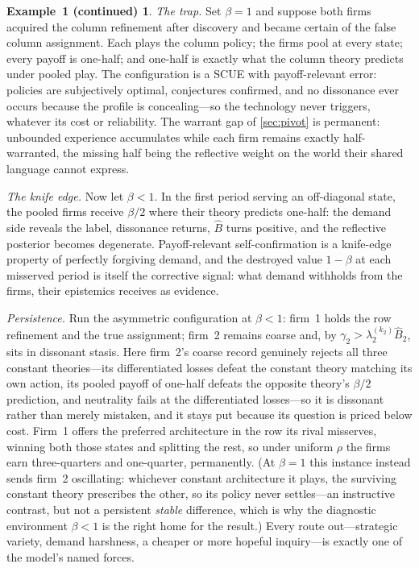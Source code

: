 \documentclass[11pt]{article}
\theoremstyle{definition}
\newtheorem*{excont}{Example~1 (continued)}
\begin{document}
\begin{excont}
\emph{The trap.}
Set $\beta=1$ and suppose both firms acquired the column refinement after discovery and became certain of the false column assignment.
Each plays the column policy; the firms pool at every state; every payoff is one-half; and one-half is exactly what the column theory predicts under pooled play.
The configuration is a SCUE with payoff-relevant error: policies are subjectively optimal, conjectures confirmed, and no dissonance ever occurs because the profile is concealing---so the technology never triggers, whatever its cost or reliability.
The warrant gap of \cref{sec:pivot} is permanent: unbounded experience accumulates while each firm remains exactly half-warranted, the missing half being the reflective weight on the world their shared language cannot express.

\emph{The knife edge.}
Now let $\beta<1$.
In the first period serving an off-diagonal state, the pooled firms receive $\beta/2$ where their theory predicts one-half: the demand side reveals the label, dissonance returns, $\widehat B$ turns positive, and the reflective posterior becomes degenerate.
Payoff-relevant self-confirmation is a knife-edge property of perfectly forgiving demand, and the destroyed value $1-\beta$ at each misserved period is itself the corrective signal: what demand withholds from the firms, their epistemics receives as evidence.

\emph{Persistence.}
Run the asymmetric configuration at $\beta<1$: firm~1 holds the row refinement and the true assignment; firm~2 remains coarse and, by $\gamma_2>\lambda_2^{(k_2)}\widehat B_2$, sits in dissonant stasis.
Here firm~2's coarse record genuinely rejects all three constant theories---its differentiated losses defeat the constant theory matching its own action, its pooled payoff of one-half defeats the opposite theory's $\beta/2$ prediction, and neutrality fails at the differentiated losses---so it is dissonant rather than merely mistaken, and it stays put because its question is priced below cost.
Firm~1 offers the preferred architecture in the row its rival misserves, winning both those states and splitting the rest, so under uniform $\rho$ the firms earn three-quarters and one-quarter, permanently.
(At $\beta=1$ this instance instead sends firm~2 oscillating: whichever constant architecture it plays, the surviving constant theory prescribes the other, so its policy never settles---an instructive contrast, but not a persistent \emph{stable} difference, which is why the diagnostic environment $\beta<1$ is the right home for the result.)
Every route out---strategic variety, demand harshness, a cheaper or more hopeful inquiry---is exactly one of the model's named forces.
\end{excont}
\end{document}
